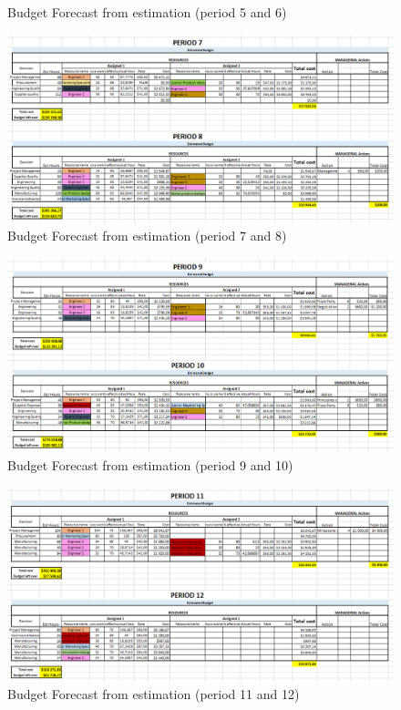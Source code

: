 \begin{appendices}
\begin{landscape}
\begin{figure}[H]
\caption{Budget Forecast from estimation (period 5 and 6)}
\end{figure}
\begin{figure}[H]
\includegraphics[scale=0.8]{budget_forecast_est_78.PNG}
\caption{Budget Forecast from estimation (period 7 and 8)}
\end{figure}
\begin{figure}[H]
\includegraphics[scale=0.8]{budget_forecast_est_910.PNG}
\caption{Budget Forecast from estimation (period 9 and 10)}
\end{figure}
\begin{figure}[H]
\includegraphics[scale=0.8]{budget_forecast_est_1112.PNG}
\caption{Budget Forecast from estimation (period 11 and 12)}
\end{figure}


\end{landscape}
\end{appendices}

